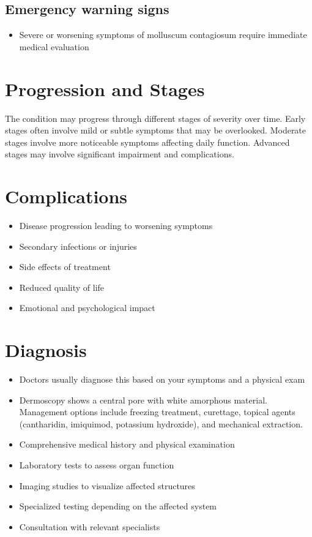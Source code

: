 \subsection{Emergency warning signs}
\begin{itemize}[noitemsep]
  \item Severe or worsening symptoms of molluscum contagiosum require immediate medical evaluation
\end{itemize}
\section{Progression and Stages}
The condition may progress through different stages of severity over time. Early stages often involve mild or subtle symptoms that may be overlooked. Moderate stages involve more noticeable symptoms affecting daily function. Advanced stages may involve significant impairment and complications.
\section{Complications}
\begin{itemize}[noitemsep]
  \item Disease progression leading to worsening symptoms
  \item Secondary infections or injuries
  \item Side effects of treatment
  \item Reduced quality of life
  \item Emotional and psychological impact
\end{itemize}
\section{Diagnosis}
\begin{itemize}[noitemsep]
  \item Doctors usually diagnose this based on your symptoms and a physical exam
  \item Dermoscopy shows a central pore with white amorphous material. Management options include freezing treatment, curettage, topical agents (cantharidin, imiquimod, potassium hydroxide), and mechanical extraction.
  \item Comprehensive medical history and physical examination
  \item Laboratory tests to assess organ function
  \item Imaging studies to visualize affected structures
  \item Specialized testing depending on the affected system
  \item Consultation with relevant specialists
\end{itemize}
